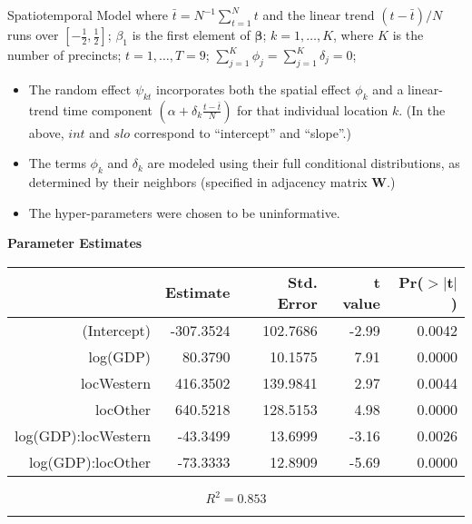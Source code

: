 \documentclass[final]{beamer}
\newlength{\colwidmiddle}
\begin{document}
\begin{frame}[t]
\begin{columns}[t]
\begin{column}{\colwidmiddle}
\begin{alertblock}{Spatiotemporal Model}
\vspace{-.5in}
where $\bar{t} = N^{-1}\sum_{t=1}^N t$ and the linear trend
$(t-\bar{t})/N$ runs over $[-\frac{1}{2}, \frac{1}{2}]$; \quad
$\beta_1$ is the first element of $\mathbf{\beta}$; \quad
$k = 1, \ldots, K$, where $K$ is the number of precincts; \quad
$t=1, \ldots, T=9$; \quad
$\sum_{j=1}^K \phi_j = \sum_{j=1}^K \delta_j = 0$; \quad


\vspace{.5in}

\begin{itemize}
\item The random effect $\psi_{kt}$ incorporates both the spatial
  effect $\phi_k$ and a linear-trend time component $(\alpha +
  \delta_k \frac{t - \bar{t}}{N})$ for that
  individual location $k$. (In the above, $int$ and $slo$ correspond
  to ``intercept'' and ``slope''.)
\item The terms $\phi_k$ and $\delta_k$ are modeled using their full
  conditional distributions, as determined by their neighbors
  (specified in adjacency matrix $\mathbf{W}$.)
\item The hyper-parameters were chosen to be uninformative.
\end{itemize}




\vspace{3in}
\textbf{Parameter Estimates}    
   {\small 
     \begin{table}[ht]
       \centering
       \begin{tabular}{rrrrr}
  \hline
 & Estimate & Std. Error & t value & Pr($>$$|$t$|$) \\ 
  \hline
(Intercept) & -307.3524 & 102.7686 & -2.99 & 0.0042 \\ 
  log(GDP) & 80.3790 & 10.1575 & 7.91 & 0.0000 \\ 
  locWestern & 416.3502 & 139.9841 & 2.97 & 0.0044 \\ 
  locOther & 640.5218 & 128.5153 & 4.98 & 0.0000 \\ 
  log(GDP):locWestern & -43.3499 & 13.6999 & -3.16 & 0.0026 \\ 
  log(GDP):locOther & -73.3333 & 12.8909 & -5.69 & 0.0000 \\ 
   \hline
\end{tabular}
\end{table}} 
  \[
   R^2 = 0.853
  \]

  
  \rule{\textwidth}{1pt}
  

\end{alertblock}
\end{column}
\end{columns}
\end{frame}
\end{document}
